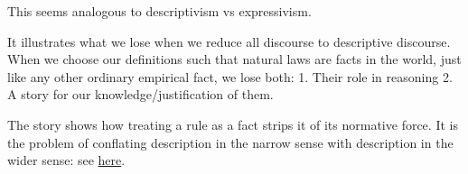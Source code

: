 
This seems analogous to descriptivism vs expressivism.

It illustrates what we lose when we reduce all discourse to descriptive discourse. When we choose our definitions such that natural laws are facts in the world, just like any other ordinary empirical fact, we lose both:
1. Their role in reasoning
2. A story for our knowledge/justification of them.

The story shows how treating a rule as a fact strips it of its normative force. It is the problem of conflating description in the narrow sense with description in the wider sense: see \href{doc/phil/People/Brandom/On Sellars/Lectures 2009/4 Lecture: Counterfactuals and Kant Sellars Thesis/12 Utility of possible worlds semantics}{here}.